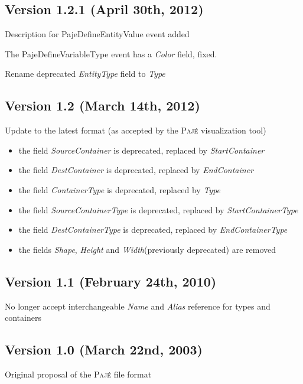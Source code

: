 \documentclass[12pt]{article}
\newcommand{\Paje}{\textsc{Paj\'e}\xspace}
\newcommand{\PajeField}[1]{\emph{#1}\xspace}
\newcommand{\Name}{\PajeField{Name}}
\newcommand{\Type}{\PajeField{Type}}
\newcommand{\StartContainerType}{\PajeField{StartContainerType}}
\newcommand{\EndContainerType}{\PajeField{EndContainerType}}
\newcommand{\Alias}{\PajeField{Alias}}
\newcommand{\EndContainer}{\PajeField{EndContainer}}
\newcommand{\StartContainer}{\PajeField{StartContainer}}
\newcommand{\Color}{\PajeField{Color}}
\newcommand{\Shape}{\PajeField{Shape}}
\newcommand{\Height}{\PajeField{Height}}
\newcommand{\Width}{\PajeField{Width}}
\newcommand{\SourceContainer}{\PajeField{SourceContainer}}
\newcommand{\DestContainer}{\PajeField{DestContainer}}
\newcommand{\ContainerType}{\PajeField{ContainerType}}
\newcommand{\SourceContainerType}{\PajeField{SourceContainerType}}
\newcommand{\DestContainerType}{\PajeField{DestContainerType}}
\newcommand{\PajeEvent}[1]{\textsf{#1}\xspace}
\newcommand{\PajeDefineVariableType}{\PajeEvent{PajeDefineVariableType}}
\newcommand{\PajeDefineEntityValue}{\PajeEvent{PajeDefineEntityValue}}
\newenvironment{itemize*}%
               {\vspace{-1em}
                 \begin{itemize}%
                   \setlength{\itemsep}{0pt}%
                   \setlength{\parskip}{0pt}}%
               {\end{itemize}}
\begin{document}
\subsection*{Version 1.2.1 (April 30th, 2012)}
\begin{itemize*}
\item Description for \PajeDefineEntityValue event added
\item The \PajeDefineVariableType event has a \Color field, fixed.
\item Rename deprecated \PajeField{EntityType} field to \Type
\end{itemize*}

\subsection*{Version 1.2 (March 14th, 2012)}
\begin{itemize*}
\item Update to the latest format (as accepted by the \Paje
  visualization tool)
  \begin{itemize}
    \item the field \SourceContainer is deprecated, replaced by \StartContainer
    \item the field \DestContainer is deprecated, replaced by \EndContainer
    \item the field \ContainerType is deprecated, replaced by \Type
    \item the field \SourceContainerType is deprecated, replaced by \StartContainerType
    \item the field \DestContainerType is deprecated, replaced by \EndContainerType
    \item the fields \Shape, \Height and \Width (previously deprecated) are removed
  \end{itemize}
\end{itemize*}


\subsection*{Version 1.1 (February 24th, 2010)}
\begin{itemize*}
\item No longer accept interchangeable \Name and \Alias reference for types and containers
\end{itemize*}

\subsection*{Version 1.0 (March 22nd, 2003)}
\begin{itemize*}
\item Original proposal of the \Paje file format
\end{itemize*}
\end{document}
